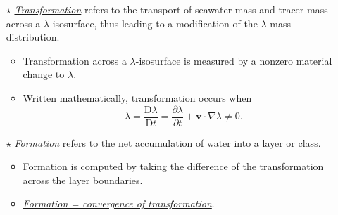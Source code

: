 \documentclass[10pt]{beamer}
\begin{document}
\begin{frame}
\begin{exampleblock}{}
\begin{itemize}
  \item[$\star$] \underline{\it Transformation} refers to the
    transport of seawater mass and tracer mass across a
    $\lambda$-isosurface, thus leading to a modification of the
    $\lambda$ mass distribution.
\begin{itemize}
      \scriptsize 
    \item Transformation across a $\lambda$-isosurface is measured by
      a nonzero material change to $\lambda$.
     \item Written mathematically, transformation occurs when 
\begin{equation*}
  \dot{\lambda}  =  \frac{\mathrm{D} \lambda}{ \mathrm{D}t}
  = \frac{\partial \lambda}{\partial t} + {\bm v} \cdot \nabla \lambda \ne 0.
\end{equation*}
    \end{itemize}


  \item[$\star$] \underline{\it Formation} refers to the net
    accumulation of water into a layer or class.
\begin{itemize}
      \scriptsize 
    \item Formation is computed by taking the difference of the
      transformation across the layer boundaries.
     \item \underline{\it Formation = convergence of transformation}.
\end{itemize}


\end{itemize}
\end{exampleblock}{}

\end{frame}
\end{document}
